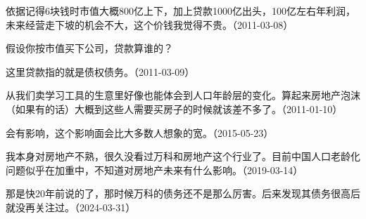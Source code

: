 
依据记得6块钱时市值大概800亿上下，加上贷款1000亿出头，100亿左右年利润，未来经营走下坡的机会不大，这个价钱我觉得不贵。（2011-03-08）


假设你按市值买下公司，贷款算谁的？

这里贷款指的就是债权债务。（2011-03-09）

从我们卖学习工具的生意里好像也能体会到人口年龄层的变化。算起来房地产泡沫（如果有的话）大概到这些人需要买房子的时候就该差不多了。（2011-01-10）


会有影响，这个影响面会比大多数人想象的宽。（2015-05-23）


我本身对房地产不熟，很久没看过万科和房地产这个行业了。目前中国人口老龄化问题似乎在加重中，不知道对房地产未来有什么影响。（2019-03-14）


那是快20年前说的了，那时候万科的债务还不是那么厉害。后来发现其债务很高后就没再关注过。（2024-03-31）
